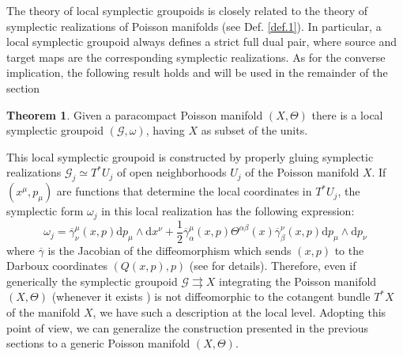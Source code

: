 \documentclass[12pt,a4paper]{article}
\numberwithin{equation}{section}
\theoremstyle{definition}
\newtheorem{theorem}{Theorem}[equation]
\newcommand{\cG}{\mathcal{G}}
\newcommand{\st}{\rightrightarrows}
\begin{document}
The theory of local symplectic groupoids is closely related to the theory of symplectic realizations of Poisson manifolds (see Def. \ref{def.1}). In particular, a local symplectic groupoid always defines a strict full dual pair, where source and target maps are the corresponding symplectic realizations. As for the converse implication, the following result holds and will be used in the remainder of the section \cite{cdw-1987}
\begin{theorem}
Given a paracompact Poisson manifold $(X,\Theta)$ there is a local symplectic groupoid $(\cG,\omega)$, having $X$ as subset of the units.
\end{theorem}

This local symplectic groupoid is constructed by properly gluing symplectic realizations $\cG_j\simeq T^*U_j$ of open neighborhoods $U_j$ of the Poisson manifold $X$. If $(x^{\mu}, p_{\mu})$ are functions that determine the local coordinates in $T^*U_j$, the symplectic form $\omega_j$ in this local realization has the following expression:
\begin{equation}\label{local_omega}
\omega_j= \overline{\gamma}^{\mu}_{\nu}(x,p) \mathrm{d}p_{\mu}\wedge\mathrm{d}x^{\nu} + \frac{1}{2} \overline{\gamma}^{\mu}_{\alpha}(x,p) \Theta^{\alpha \beta}(x) \overline{\gamma}^{\nu}_{\beta} (x,p)\mathrm{d}p_{\mu}\wedge\mathrm{d}p_{\nu}
\end{equation}
where $\overline{\gamma}$ is the Jacobian of the diffeomorphism which sends $(x,p)$ to the Darboux coordinates $(Q(x,p),p)$ (see \cite{Weinstein83} for details). Therefore, even if generically the symplectic groupoid $\cG\st X$ integrating the Poisson manifold $(X,\Theta)$ (whenever it exists \cite{Crainic-fernandes_2}) is not diffeomorphic to the cotangent bundle $T^*X$ of the manifold $X$, we have such a description at the local level. Adopting this point of view, we can generalize the construction presented in the previous sections to a generic Poisson manifold $(X,\Theta)$. 
\end{document}

